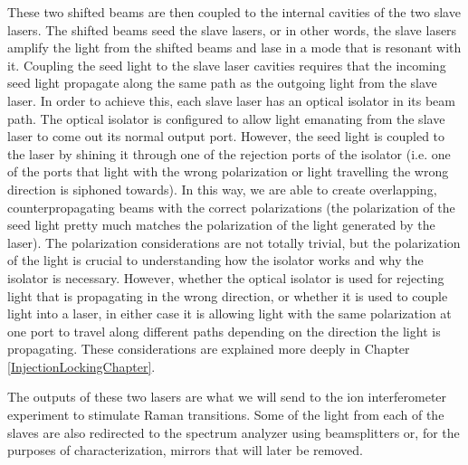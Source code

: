 These two shifted beams are then coupled to the internal cavities of the two slave lasers. The shifted beams seed the slave lasers, or in other words, the slave lasers amplify the light from the shifted beams and lase in a mode that is resonant with it. Coupling the seed light to the slave laser cavities requires that the incoming seed light propagate along the same path as the outgoing light from the slave laser. In order to achieve this, each slave laser has an optical isolator in its beam path. The optical isolator is configured to allow light emanating from the slave laser to come out its normal output port. However, the seed light is coupled to the laser by shining it through one of the rejection ports of the isolator (i.e. one of the ports that light with the wrong polarization or light travelling the wrong direction is siphoned towards). In this way, we are able to create overlapping, counterpropagating beams with the correct polarizations (the polarization of the seed light pretty much matches the polarization of the light generated by the laser). The polarization considerations are not totally trivial, but the polarization of the light is crucial to understanding how the isolator works and why the isolator is necessary. However, whether the optical isolator is used for rejecting light that is propagating in the wrong direction, or whether it is used to couple light into a laser, in either case it is allowing light with the same polarization at one port to travel along different paths depending on the direction the light is propagating. 
These considerations are explained more deeply in Chapter\,\ref{InjectionLockingChapter}. 

The outputs of these two lasers are what we will send to the ion interferometer experiment to stimulate Raman transitions. Some of the light from each of the slaves are also redirected to the spectrum analyzer using beamsplitters or, for the purposes of characterization, mirrors that will later be removed.


